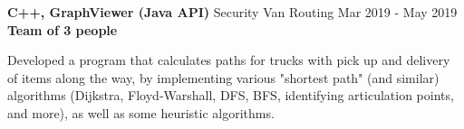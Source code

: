 \cventry
  {\textbf{C++, GraphViewer (Java API)}}
  {Security Van Routing \href{https://github.com/EduRibeiro00/SecurityVanRouting-feup-cal}{\faExternalLink}} %
  {Mar 2019 - May 2019}
  {\textbf{Team of 3 people}}
  {
    \begin{cvitems} %
      \item {Developed a program that calculates paths for trucks with pick up and delivery of items along the way, by implementing various "shortest path" (and similar) algorithms (Dijkstra, Floyd‐Warshall, DFS, BFS, identifying articulation points, and more), as well as some heuristic algorithms.}
    \end{cvitems}
  }